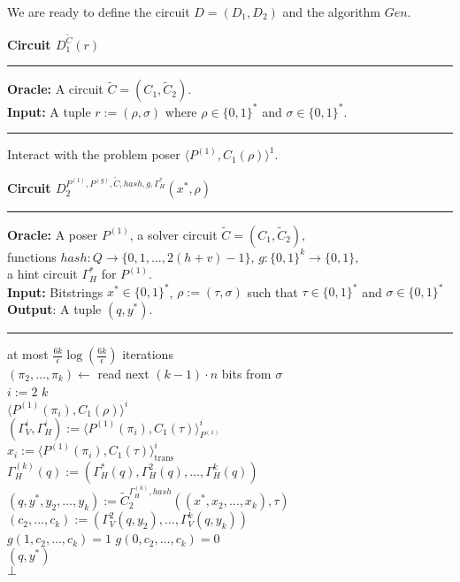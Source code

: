 %
We are ready to define the circuit $D = (D_1, D_2)$ and the algorithm $Gen$.
%
\begin{codeblock}
  \textbf{Circuit $D_1^{\widetilde{C}}(r)$}
  \medskip \hrule \medskip
  \textbf{Oracle:} A circuit $\widetilde{C} = (C_1, \widetilde{C}_2)$.\\
  \textbf{Input:} A tuple $r := (\rho, \sigma)$ where $ \rho \in \{0,1\}^{*}$ and $\sigma \in \{0,1\}^{*}$.
  \medskip\hrule\medskip
  Interact with the problem poser $\langle P^{(1)}, C_1(\rho) \rangle^1$.
\end{codeblock}
%
\begin{codeblock}
  \textbf{Circuit $D_2^{P^{(1)}, P^{(g)}, \widetilde{C}, hash, g,  \Gamma_H^*}(x^*, \rho)$}
  \medskip \hrule \medskip
  \textbf{Oracle:} A poser $P^{(1)}$, a solver circuit $\widetilde{C} = (C_1, \widetilde{C}_2)$, \\
  \IndII functions $hash : Q \rightarrow \{0,1, \dots, 2(h+v)-1\}$, $g:\{0,1\}^k \rightarrow \{0,1\}$, \\
  \IndII a hint circuit $\Gamma_H^*$ for $P^{(1)}$. \\
  \textbf{Input:} Bitstrings $x^* \in \{0,1\}^{*}$, $\rho := (\tau, \sigma)$ such that $\tau \in \{0,1\}^{*}$ and $\sigma \in \{0,1\}^{*}$\\
  \textbf{Output}: A tuple $(q, y^*)$.
  \medskip \hrule \medskip
  \For at most $\frac{6k}{\epsilon} \log(\frac{6k}{\epsilon})$ iterations \Do \\
  \IndI $(\pi_2, \dots, \pi_k) \leftarrow$ read next $(k-1)\cdot n$ bits from $\sigma$ \\
  \IndI \For $i:=2$ \To $k$ \Do \\
  \IndII \Run $\langle P^{(1)}(\pi_i), C_1(\rho)\rangle^i$ \\
  \IndIII $(\Gamma_V^{i}, \Gamma_H^{i}) := \langle P^{(1)}(\pi_i), C_1(\tau) \rangle^i_{P^{(1)}}$ \\
  \IndIII $x_i := \langle P^{(1)}(\pi_i), C_1(\tau) \rangle^i_{\text{trans}}$ \\
  \IndI $\Gamma_H^{(k)}(q) := (\Gamma_H^{*}(q), \Gamma_H^{2}(q), \dots, \Gamma_H^{k}(q))$ \\
  \IndI $(q, y^*, y_2, \dots, y_k) := \widetilde{C}_2^{\Gamma_H^{(k)}, hash}((x^*, x_2, \dots, x_k), \tau)$\\
  \IndI $(c_2, \dots, c_k) := (\Gamma_V^2(q, y_2), \dots, \Gamma_V^{k}(q, y_k))$ \\
  \IndI \If $g(1, c_{2}, \dots, c_k) = 1$ \And $g(0,c_{2}, \dots, c_k) = 0$ \Then \\
  \IndII \Return $(q, y^*)$ \\
  \Return $\bot$
%
\end{codeblock}
